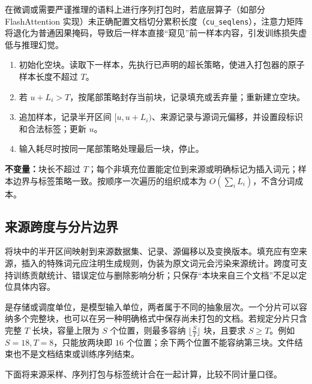 \documentclass[../textbook.tex]{subfiles}
\begin{document}
\begin{warning}[序列打包的隐式上下文污染]
在微调或需要严谨推理的语料上进行序列打包时，若底层算子（如部分 FlashAttention 实现）未正确配置文档切分累积长度（\texttt{cu\_seqlens}），注意力矩阵将退化为普通因果掩码，导致后一样本直接“窥见”前一样本内容，引发训练损失虚低与推理幻觉。
\end{warning}

\begin{algorithm}[保持来源的原子样本打包]
\begin{enumerate}
\item 初始化空块。读取下一样本，先执行已声明的超长策略，使进入打包器的原子样本长度不超过 $T$。
\item 若 $u+L_i>T$，按尾部策略封存当前块，记录填充或丢弃量；重新建立空块。
\item 追加样本，记录半开区间 $[u,u+L_i)$、来源记录与源词元偏移，并设置段标识和合法标签；更新 $u$。
\item 输入耗尽时按同一尾部策略处理最后一块，停止。
\end{enumerate}
\textbf{不变量：}块长不超过 $T$；每个非填充位置能定位到来源或明确标记为插入词元；样本边界与标签策略一致。按顺序一次遍历的组织成本为 $O(\sum_iL_i)$，不含分词成本。
\end{algorithm}

\subsection{来源跨度与分片边界}
将块中的半开区间映射到来源数据集、记录、源偏移以及变换版本。填充应有空来源，插入的特殊词元应注明生成规则，伪装为原文词元会污染来源统计。跨度可支持训练贡献统计、错误定位与删除影响分析；只保存“本块来自三个文档”不足以定位具体内容。

是存储或调度单位，是模型输入单位，两者属于不同的抽象层次。一个分片可以容纳多个完整块，也可以在另一种明确格式中保存尚未打包的文档。若规定分片只含完整 $T$ 长块，容量上限为 $S$ 个位置，则最多容纳 $\lfloor \frac{S}{T}\rfloor$ 块，且要求 $S\ge T$。例如 $S=18,T=8$，只能放两块即 $16$ 个位置；余下两个位置不能容纳第三块。文件结束也不是文档结束或训练序列结束。

下面将来源采样、序列打包与标签统计合在一起计算，比较不同计量口径。
\end{document}

